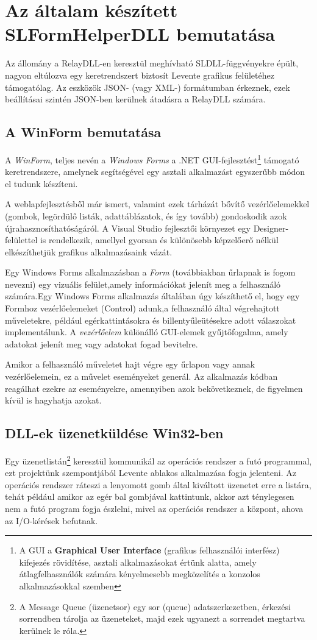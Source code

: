 \documentclass[tocnopagenum]{thesis-ekf}
\theoremstyle{definition}
\theoremstyle{remark}
\begin{document}
	\section{Az általam készített SLFormHelperDLL bemutatása}
	Az állomány a RelayDLL-en keresztül meghívható SLDLL-függvényekre épült, nagyon eltúlozva egy keretrendszert biztosít Levente grafikus felületéhez támogatólag. Az eszközök JSON- (vagy XML-) formátumban érkeznek, ezek beállításai szintén JSON-ben kerülnek átadásra a RelayDLL számára.
	
	\subsection{A WinForm bemutatása}
	A \textit{WinForm}, teljes nevén a \textit{Windows Forms} a .NET GUI-fejlesztést\footnote{A GUI a \textbf{Graphical User Interface} (grafikus felhasználói interfész) kifejezés rövidítése, asztali alkalmazásokat értünk alatta, amely átlagfelhasználók számára kényelmesebb megközelítés a konzolos alkalmazásokkal szemben} támogató keretrendszere, amelynek segítségével egy asztali alkalmazást egyszerűbb módon el tudunk készíteni. 
	
	A weblapfejlesztésből már ismert, valamint ezek tárházát bővítő vezérlőelemekkel (gombok, legördülő listák, adattáblázatok, és így tovább) gondoskodik azok újrahasznosíthatóságáról. A Visual Studio fejlesztői környezet egy Designer-felülettel is rendelkezik, amellyel gyorsan és különösebb képzelőerő nélkül elkészíthetjük grafikus alkalmazásaink vázát.
	
	Egy Windows Forms alkalmazásban a \textit{Form} (továbbiakban űrlapnak is fogom nevezni) egy vizuális felület,amely információkat jelenít meg a felhasználó számára.Egy Windows Forms alkalmazás általában úgy készíthető el, hogy egy Formhoz vezérlőelemeket (Control) adunk,a felhasználó által végrehajtott műveletekre, például egérkattintásokra és billentyűleütésekre adott válaszokat implementálunk. A \textit{vezérlőelem} különálló GUI-elemek gyűjtőfogalma, amely adatokat jelenít meg vagy adatokat fogad bevitelre.
	
	Amikor a felhasználó műveletet hajt végre egy űrlapon vagy annak vezérlőelemein, ez a művelet eseményeket generál. Az alkalmazás kódban reagálhat ezekre az eseményekre, amennyiben azok bekövetkeznek, de figyelmen kívül is hagyhatja azokat.\cite{winform}
	\subsection{DLL-ek üzenetküldése Win32-ben}
	Egy üzenetlistán\footnote{A Message Queue (üzenetsor) egy sor (queue) adatszerkezetben, érkezési sorrendben tárolja az üzeneteket, majd ezek ugyanezt a sorrendet megtartva kerülnek le róla.} keresztül kommunikál az operációs rendszer a futó programmal, ezt projektünk szempontjából Levente ablakos alkalmazása fogja jelenteni. Az operációs rendszer ráteszi a lenyomott gomb által kiváltott üzenetet erre a listára, tehát például amikor az egér bal gombjával kattintunk, akkor azt ténylegesen nem a futó program fogja észlelni, mivel az operációs rendszer a központ, ahova az I/O-kérések befutnak. 
	
\end{document}
